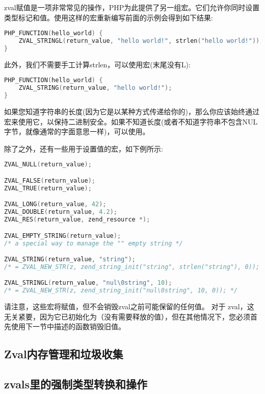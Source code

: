 zval赋值是一项非常常见的操作，PHP为此提供了另一组宏。它们允许你同时设置类型标记和值。使用这样的宏重新编写前面的示例会得到如下结果:

\begin{lstlisting}[language=c]
PHP_FUNCTION(hello_world) {
    ZVAL_STRINGL(return_value, "hello world!", strlen("hello world!"));
}
\end{lstlisting}

此外，我们不需要手工计算strlen，可以使用宏(末尾没有L):

\begin{lstlisting}[language=c]
PHP_FUNCTION(hello_world) {
    ZVAL_STRING(return_value, "hello world!");
}
\end{lstlisting}

如果您知道字符串的长度(因为它是以某种方式传递给你的)，那么你应该始终通过宏来使用它，以保持二进制安全。如果不知道长度(或者不知道字符串不包含NUL字节，就像通常的字面意思一样)，可以使用。

除了之外，还有一些用于设置值的宏，如下例所示:

\begin{lstlisting}[language=c]
ZVAL_NULL(return_value);

ZVAL_FALSE(return_value);
ZVAL_TRUE(return_value);

ZVAL_LONG(return_value, 42);
ZVAL_DOUBLE(return_value, 4.2);
ZVAL_RES(return_value, zend_resource *);

ZVAL_EMPTY_STRING(return_value);
/* a special way to manage the "" empty string */

ZVAL_STRING(return_value, "string");
/* = ZVAL_NEW_STR(z, zend_string_init("string", strlen("string"), 0)); */

ZVAL_STRINGL(return_value, "nul\0string", 10);
/* = ZVAL_NEW_STR(z, zend_string_init("nul\0string", 10, 0)); */
\end{lstlisting}


请注意，这些宏将赋值，但不会销毁zval之前可能保留的任何值。 对于 zval，这无关紧要，因为它已初始化为（没有需要释放的值），但在其他情况下，您必须首先使用下一节中描述的函数销毁旧值。


\clearpage
\subsection{Zval内存管理和垃圾收集}


\clearpage
\subsection{zvals里的强制类型转换和操作}


